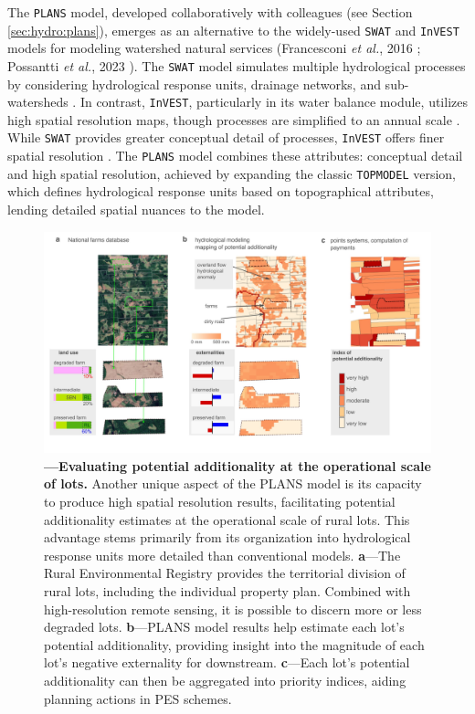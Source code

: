 \documentclass[./main_en.tex]{subfiles}
\begin{document}
The \texttt{PLANS} model, developed collaboratively with colleagues (see Section \ref{sec:hydro:plans}), emerges as an alternative to the widely-used \texttt{SWAT} and \texttt{InVEST} models for modeling watershed natural services (Francesconi \textit{et al.}, 2016 \cite{Francesconi2016}; Possantti \textit{et al.}, 2023 \cite{Possantti2023a}). The \texttt{SWAT} model simulates multiple hydrological processes by considering hydrological response units, drainage networks, and sub-watersheds \cite{Strauch2013}. In contrast, \texttt{InVEST}, particularly in its water balance module, utilizes high spatial resolution maps, though processes are simplified to an annual scale \cite{Daneshi2021a}. While \texttt{SWAT} provides greater conceptual detail of processes, \texttt{InVEST} offers finer spatial resolution \cite{Cong2020a}. The \texttt{PLANS} model combines these attributes: conceptual detail and high spatial resolution, achieved by expanding the classic \texttt{TOPMODEL} version, which defines hydrological response units based on topographical attributes, lending detailed spatial nuances to the model.

\begin{figure}[t!] 
\centering				
\includegraphics[width=0.98\linewidth]{figs/fig_lotscale_en.jpg}		
\caption[Additionality at the operational lot scale]
{\textbf{---\;Evaluating potential additionality at the operational scale of lots.}
    Another unique aspect of the PLANS model is its capacity to produce high spatial resolution results, facilitating potential additionality estimates at the operational scale of rural lots. This advantage stems primarily from its organization into hydrological response units more detailed than conventional models. 
    \;\textbf{a}\;---\;The Rural Environmental Registry provides the territorial division of rural lots, including the individual property plan. Combined with high-resolution remote sensing, it is possible to discern more or less degraded lots.    
    \;\textbf{b}\;---\;PLANS model results help estimate each lot's potential additionality, providing insight into the magnitude of each lot's negative externality for downstream.    
    \;\textbf{c}\;---\;Each lot's potential additionality can then be aggregated into priority indices, aiding planning actions in PES schemes.
}
\label{fig:eco:addplans2} 		
\end{figure}
\end{document}
